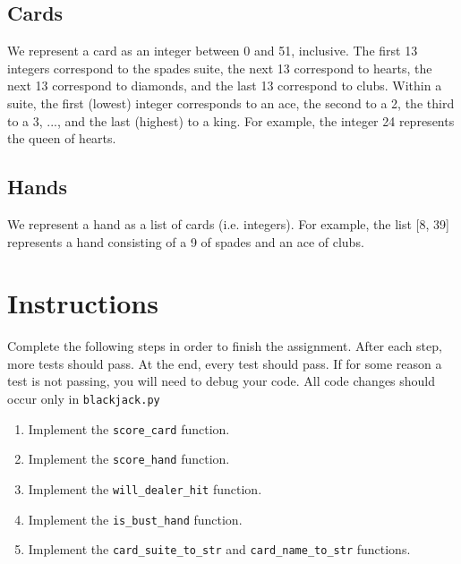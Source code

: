 \documentclass{article}
\begin{document}
\subsection{Cards}
We represent a card as an integer between 0 and 51, inclusive. The first 13 integers correspond to the spades suite, the next 13 correspond to hearts, the next 13 correspond to diamonds, and the last 13 correspond to clubs. Within a suite, the first (lowest) integer corresponds to an ace, the second to a 2, the third to a 3, ..., and the last (highest) to a king. For example, the integer 24 represents the queen of hearts. 

\subsection{Hands}
We represent a hand as a list of cards (i.e. integers). For example, the list [8, 39] represents a hand consisting of a 9 of spades and an ace of clubs. 


\section{Instructions} 
Complete the following steps in order to finish the assignment. After each step, more tests should pass. At the end, every test should pass. If for some reason a test is not passing, you will need to debug your code. All code changes should occur only in \texttt{blackjack.py}

\begin{enumerate}
    \item Implement the \texttt{score\_card} function.
    \item Implement the \texttt{score\_hand} function.
    \item Implement the \texttt{will\_dealer\_hit} function.
    \item Implement the \texttt{is\_bust\_hand} function.
    \item Implement the \texttt{card\_suite\_to\_str} and \texttt{card\_name\_to\_str} functions.
\end{enumerate}
\end{document}
